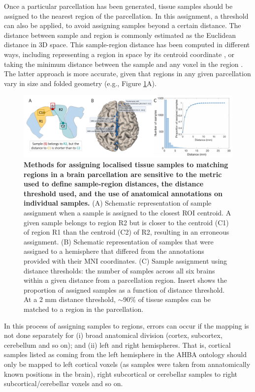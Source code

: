 Once a particular parcellation has been generated, tissue samples should be assigned to the nearest region of the parcellation. In this assignment, a threshold can also be applied, to avoid assigning samples beyond a certain distance. The distance between sample and region is commonly estimated as the Euclidean distance in 3D space. This sample-region distance has been computed in different ways, including representing a region in space by its centroid coordinate \mbox{\citep{Vertes2016b,Whitaker2016a,McColgan2018}}, or taking the minimum distance between the sample and any voxel in the region \citep{French2015,Parkes2017,Romme2017}. The latter approach is more accurate, given that regions in any given parcellation vary in size and folded geometry (e.g., Figure \ref{fig:Ch4Fig5}A).

\begin{figure}[h!]
  \centering
    \includegraphics[width=1\textwidth]{Chapter4/Ch4Fig5.pdf}
\caption{\textbf{Methods for assigning localised tissue samples to matching regions in a brain parcellation are sensitive to the metric used to define sample-region distances, the distance threshold used, and the use of anatomical annotations on individual samples.}
(A) Schematic representation of sample assignment when a sample is assigned to the closest ROI centroid. A given sample belongs to region R2 but is closer to the centroid (C1) of region R1 than the centroid (C2) of R2, resulting in an erroneous assignment.
(B) Schematic representation of samples that were assigned to a hemisphere that differed from the annotations provided with their MNI coordinates.
(C) Sample assignment using distance thresholds: the number of samples across all six brains within a given distance from a parcellation region. Insert shows the proportion of assigned samples as a function of distance threshold. At a 2 mm distance threshold, $\sim$90\%  of tissue samples can be matched to a region in the parcellation. }
\label{fig:Ch4Fig5}
\end{figure}

In this process of assigning samples to regions, errors can occur if the mapping is not done separately for (i) broad anatomical division (cortex, subcortex, cerebellum and so on); and (ii) left and right hemispheres. That is, cortical samples listed as coming from the left hemisphere in the AHBA ontology should only be mapped to left cortical voxels (as samples were taken from annatomically known positions in the brain), right subcortical or cerebellar samples to right subcortical/cerebellar voxels and so on.

